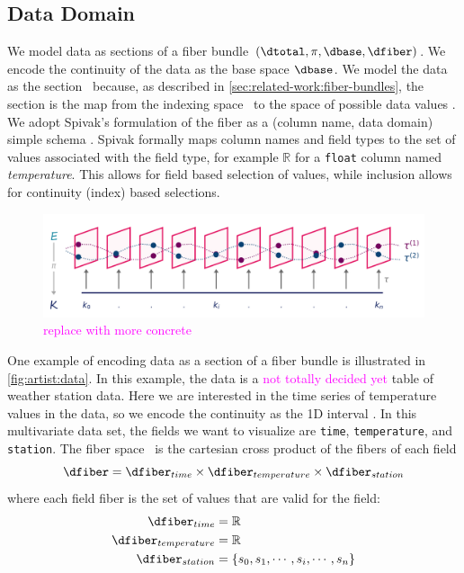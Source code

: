 \documentclass[10pt,journal,compsoc]{IEEEtran}
\newcommand{\note}[1]{\textcolor{magenta}{#1}}
\theoremstyle{definition}
\theoremstyle{remark}
\begin{document}
\subsection{Data Domain}
We model data as sections of a fiber bundle $(\dtotal, \pi, \dbase, \dfiber)$. We encode the continuity of the data as the \textcolor{base}{base space} $\dbase$. We model the data as the section \dsection\ because, as described in \autoref{sec:related-work:fiber-bundles}, the section is the map from the indexing space \dbase\ to the space of possible data values \dfiber. We adopt Spivak's formulation of the fiber as a (column name, data domain) simple schema \cite{spivakSIMPLICIALDATABASES,spivakDatabasesAreCategories2010}. Spivak formally maps column names and field types to the set of values associated with the field type, for example $\mathbb{R}$ for a \texttt{float} column named \textit{temperature}. This allows for field based selection of values, while inclusion allows for continuity (index) based selections. 


\begin{figure}[h!]
  \includegraphics[width=\columnwidth]{fiberbundle.png}
  \caption{\note{replace with more concrete}}
  \label{fig:artist:data}
\end{figure}

One example of encoding data as a section of a fiber bundle is illustrated in \autoref{fig:artist:data}. In this example, the data is a \note{not totally decided yet} table of weather station data. Here we are interested in the time series of temperature values in the data, so we encode the continuity as the 1D interval \dbase. In this multivariate data set, the fields we want to visualize are \texttt{time}, \texttt{temperature}, and \texttt{station}. The fiber space \dfiber\ is the cartesian cross product of the fibers of each field
\begin{equation*}
  \dfiber = \dfiber_{time} \times \dfiber_{temperature} \times \dfiber_{station}
\end{equation*}
where each field fiber is the set of values that are valid for the field: 
\begin{align*}
  \dfiber_{time} &= \mathbb{R} \\
  \dfiber_{temperature} &= \mathbb{R}\\
  \dfiber_{station} &= \{s_0, s_1, \cdots, s_i, \cdots, s_n\} 
\end{align*}
\end{document}
